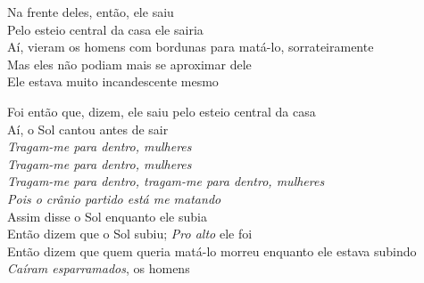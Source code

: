 \begin{linenumbers}\begingroup\raggedright
\noindent Na frente deles, então, ele saiu\\
Pelo esteio central da casa ele sairia\\
Aí, vieram os homens com bordunas para matá-lo, sorrateiramente\\
Mas eles não podiam mais se aproximar dele\\
Ele estava muito incandescente mesmo
\end{linenumbers}\endgroup

\bigskip

\begin{linenumbers}\begingroup\raggedright
\noindent Foi então que, dizem, ele saiu pelo esteio central da casa\\
Aí, o Sol cantou antes de sair\\
\textit{Tragam-me para dentro, mulheres}\\
\textit{Tragam-me para dentro, mulheres}\\
\textit{Tragam-me para dentro, tragam-me para dentro, mulheres}\\
\textit{Pois o crânio partido está me matando}\\
Assim disse o Sol enquanto ele subia\\
Então dizem que o Sol subiu; \textit{Pro alto} ele foi\\
Então dizem que quem queria matá-lo morreu enquanto ele estava subindo\\
\textit{Caíram esparramados}, os homens
\end{linenumbers}\endgroup

